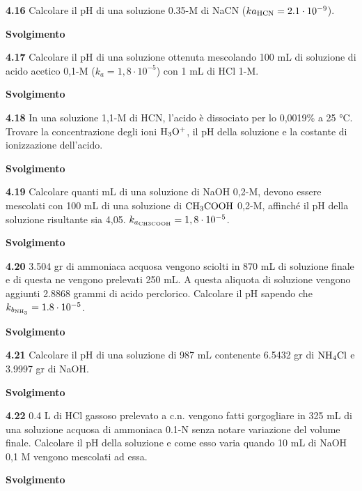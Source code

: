 \vspace{0.2cm}

\vspace{0.2cm}\textbf{4.16} Calcolare il pH di una soluzione 0.35-M di NaCN ($k{a_{\rm HCN}} = 2.1 \cdot 10^{-9}$).

\large\textbf{Svolgimento}\normalsize

\vspace{0.2cm}

\vspace{0.2cm}\textbf{4.17} Calcolare il pH di una soluzione ottenuta mescolando 100 mL di soluzione di acido acetico 0,1-M ($k_a = 1,8 \cdot 10^{-5}$) con 1 mL di HCl 1-M.

\large\textbf{Svolgimento}\normalsize

\vspace{0.2cm}

\vspace{0.2cm}\textbf{4.18}  In una soluzione 1,1-M di HCN, l’acido è dissociato per lo 0,0019\% a 25 °C. Trovare la concentrazione degli ioni $\rm H_3O^+$, il pH della soluzione e la costante di ionizzazione dell’acido. 

\large\textbf{Svolgimento}\normalsize

\vspace{0.2cm}

\vspace{0.2cm}\textbf{4.19}  Calcolare quanti mL di una soluzione di NaOH 0,2-M, devono essere mescolati con
100 mL di una soluzione di $\rm CH_3COOH$ 0,2-M, affinché il pH della soluzione risultante sia 4,05. $k_{a_{\rm CH3COOH}}= 1,8 \cdot 10^{-5}$.

\large\textbf{Svolgimento}\normalsize

\vspace{0.2cm}

\vspace{0.2cm}\textbf{4.20} 3.504 gr di ammoniaca acquosa vengono sciolti in 870 mL di soluzione finale e di questa ne vengono prelevati 250 mL. A questa aliquota di soluzione vengono aggiunti 2.8868 grammi di acido perclorico. Calcolare il pH sapendo che $k_{b_{\rm NH_3}}=1.8 \cdot 10^{-5}$.

\large\textbf{Svolgimento}\normalsize

\vspace{0.2cm}

\vspace{0.2cm}\textbf{4.21} Calcolare il pH di una soluzione di 987 mL contenente 6.5432 gr di $\rm NH_4Cl$ e 3.9997 gr di NaOH.

\large\textbf{Svolgimento}\normalsize

\vspace{0.2cm}

\vspace{0.2cm}\textbf{4.22} 0.4 L di HCl gassoso prelevato a c.n. vengono fatti gorgogliare in 325 mL di una soluzione acquosa di ammoniaca 0.1-N senza notare variazione del volume finale. Calcolare il pH della soluzione e come esso varia quando 10 mL di NaOH 0,1 M vengono mescolati ad essa.

\large\textbf{Svolgimento}\normalsize

\vspace{0.2cm}